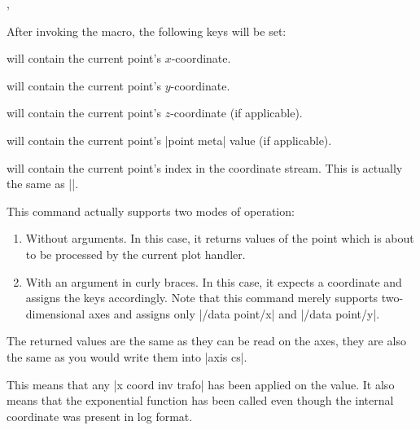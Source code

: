 \begin{commandlist}{\pgfplotspointgetcoordinates,\pgfplotspointgetcoordinates{}}

    After invoking the macro, the following keys will be set:

     will contain the current point's $x$-coordinate.

     will contain the current point's $y$-coordinate.

     will contain the current point's $z$-coordinate
    (if applicable).

     will contain the current point's
    |point meta| value (if applicable).

     will contain the current point's index in
    the coordinate stream. This is actually the same as |\coordindex|.

    This command actually supports two modes of operation:
    \begin{enumerate}
        \item Without arguments. In this case, it returns values of the point
            which is about to be processed by the current plot handler.
        \item With an argument in curly braces. In this case, it expects a
            coordinate and assigns the keys accordingly. Note that this
            command merely supports two-dimensional axes and assigns only
            |/data point/x| and |/data point/y|.
    \end{enumerate}

    The returned values are the same as they can be read on the axes, they are
    also the same as you would write them into |axis cs|.

    This means that any |x coord inv trafo| has been applied on the value. It
    also means that the exponential function has been called even though the
    internal coordinate was present in log format.


\end{commandlist}
